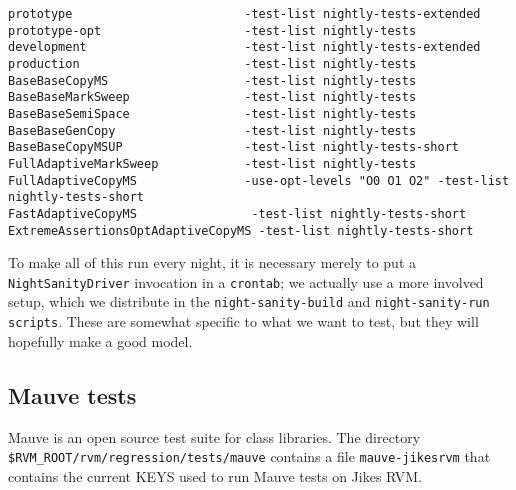 \begin{verbatim}
prototype                        -test-list nightly-tests-extended
prototype-opt                    -test-list nightly-tests
development                      -test-list nightly-tests-extended
production                       -test-list nightly-tests
BaseBaseCopyMS                   -test-list nightly-tests
BaseBaseMarkSweep                -test-list nightly-tests
BaseBaseSemiSpace                -test-list nightly-tests
BaseBaseGenCopy                  -test-list nightly-tests
BaseBaseCopyMSUP                 -test-list nightly-tests-short
FullAdaptiveMarkSweep            -test-list nightly-tests
FullAdaptiveCopyMS               -use-opt-levels "O0 O1 O2" -test-list nightly-tests-short
FastAdaptiveCopyMS                -test-list nightly-tests-short
ExtremeAssertionsOptAdaptiveCopyMS -test-list nightly-tests-short
\end{verbatim}

 To make all of this run every night, it is necessary merely to put a
{\tt Night\-San\-i\-ty\-Dri\-ver} invocation in a {\tt crontab}; we actually use a more
involved setup, which we distribute in the {\tt night-sanity-build} and
{\tt night-sanity-run scripts}.  These are somewhat specific to what we want
to test, but they will hopefully make a good model.

\subsection{Mauve tests}
Mauve is an open source test suite for class libraries.  The directory 
{\tt{\$RVM\_\-ROOT/\-rvm/\-re\-gres\-sion/\-tests/\-mauve}} contains a file
{\tt mauve-jikesrvm} that contains the current KEYS used to run Mauve tests
on Jikes RVM.\@ 

